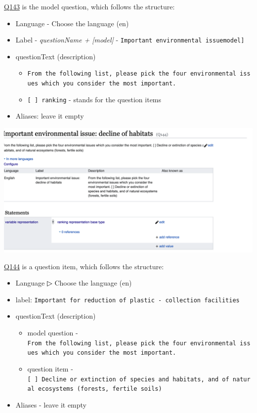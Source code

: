 \documentclass[
  letterpaper,
  DIV=11,
  numbers=noendperiod]{scrreprt}
\providecommand{\tightlist}{%
  \setlength{\itemsep}{0pt}\setlength{\parskip}{0pt}}\usepackage{longtable,booktabs,array}
\begin{document}
\href{https://reprexbase.eu/demowiki/index.php?title=Item:Q143}{Q143} is
the model question, which follows the structure:

\begin{itemize}
\item
  Language - Choose the language (en)
\item
  Label - \emph{questionName + {[}model{]}} -
  \texttt{Important\ environmental\ issue\textasciigrave{}\textasciigrave{}{[}model{]}}~
\item
  questionText (description)

  \begin{itemize}
  \item
    \texttt{From\ the\ following\ list,\ please\ pick\ the\ four\ environmental\ issues\ which\ you\ consider\ the\ most\ important.}
  \item
    \texttt{{[}\ {]}\ ranking} - stands for the question items
  \end{itemize}
\item
  Aliases: leave it empty
\end{itemize}

\begin{center}
\includegraphics{png/question_to_wikibase/multipleChoiceQuestion_questionItem_2x1.png}
\end{center}

\href{https://reprexbase.eu/demowiki/index.php?title=Item:Q144}{Q144} is
a question item, which follows the structure:

\begin{itemize}
\tightlist
\item
  Language ▷ Choose the language (en)
\item
  label:
  \texttt{Important\ for\ reduction\ of\ plastic\ -\ collection\ facilities}
\item
  questionText (description)

  \begin{itemize}
  \tightlist
  \item
    model question -
    \texttt{From\ the\ following\ list,\ please\ pick\ the\ four\ environmental\ issues\ which\ you\ consider\ the\ most\ important.}
  \item
    question item -
    \texttt{{[}\ {]}\ Decline\ or\ extinction\ of\ species\ and\ habitats,\ and\ of\ natural\ ecosystems\ (forests,\ fertile\ soils)}
  \end{itemize}
\item
  Aliases - leave it empty
\end{itemize}
\end{document}
